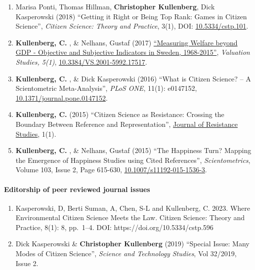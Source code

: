 \documentclass[
]{article}
\providecommand{\tightlist}{%
  \setlength{\itemsep}{0pt}\setlength{\parskip}{0pt}}
\begin{document}
\begin{enumerate}
\item
  Marisa Ponti, Thomas Hillman, \textbf{Christopher Kullenberg}, Dick
  Kasperowski (2018) ``Getting it Right or Being Top Rank: Games in
  Citizen Science'', \emph{Citizen Science: Theory and Practice}, 3(1),
  DOI: \href{http://doi.org/10.5334/cstp.101}{10.5334/cstp.101}.
\item
  \textbf{Kullenberg, C.} , \& Nelhans, Gustaf (2017)
  \href{https://dx.doi.org/10.3384/VS.2001-5992.17517}{``Measuring
  Welfare beyond GDP - Objective and Subjective Indicators in Sweden,
  1968-2015''}, \emph{Valuation Studies, 5(1)},
  \href{https://dx.doi.org/10.3384/VS.2001-5992.17517}{10.3384/VS.2001-5992.17517}.
\item
  \textbf{Kullenberg, C.} , \& Dick Kasperowski (2016) ``What is Citizen
  Science? -- A Scientometric Meta-Analysis'', \emph{PLoS ONE}, 11(1):
  e0147152,
  \href{http://dx.doi.org/10.1371/journal.pone.0147152}{10.1371/journal.pone.0147152}.
\item
  \textbf{Kullenberg, C.} (2015) ``Citizen Science as Resistance:
  Crossing the Boundary Between Reference and Representation'',
  \href{https://gup.ub.gu.se/publication/218601-citizen-science-as-resistance-crossing-the-boundary-between-reference-and-representation}{Journal
  of Resistance Studies}, 1(1).
\item
  \textbf{Kullenberg, C.} , \& Nelhans, Gustaf (2015) ``The Happiness
  Turn? Mapping the Emergence of Happiness Studies using Cited
  References'', \emph{Scientometrics}, Volume 103, Issue 2, Page
  615-630,
  \href{http://dx.doi.org/10.1007/s11192-015-1536-3}{10.1007/s11192-015-1536-3}.
\end{enumerate}

\hypertarget{editorship-of-peer-reviewed-journal-issues}{%
\paragraph{Editorship of peer reviewed journal
issues}\label{editorship-of-peer-reviewed-journal-issues}}

\begin{enumerate}
\def\labelenumi{\arabic{enumi}.}
\tightlist
\item
  Kasperowski, D, Berti Suman, A, Chen, S-L and Kullenberg, C. 2023.
  Where Environmental Citizen Science Meets the Law. Citizen Science:
  Theory and Practice, 8(1): 8, pp.~1--4. DOI:
  https://doi.org/10.5334/cstp.596
\item
  Dick Kasperowski \& \textbf{Christopher Kullenberg} (2019) ``Special
  Issue: Many Modes of Citizen Science'', \emph{Science and Technology
  Studies}, Vol 32/2019, Issue 2.
\end{enumerate}
\end{document}
